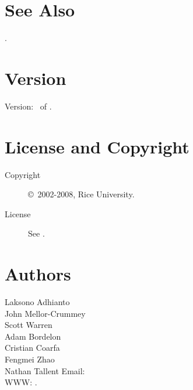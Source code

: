 \documentclass[english]{article}
\begin{document}
\section{See Also}

.

\section{Version}

Version: \Version\ of \Date.

\section{License and Copyright}

\begin{description}
\item[Copyright] \copyright\ 2002-2008, Rice University.
\item[License] See .
\end{description}

\section{Authors}

\noindent
Laksono Adhianto \\
John Mellor-Crummey \\
Scott Warren \\
Adam Bordelon \\
Cristian Coarfa \\
Fengmei Zhao \\
Nathan Tallent
Email:  \\
WWW: .

\LatexManEnd
\end{document}
